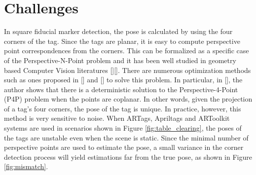 \section{Challenges}
\label{sec:problem}
In square fiducial marker detection, the pose is calculated by using the four corners of the tag. Since the tags are planar, it is easy to compute perspective point correspondences from the corners. This can be formalized as a specific case of the Perspective-N-Point problem and it has been well studied in geometry based Computer Vision literatures [][]. There are numerous optimization methods such as ones proposed in [] and [] to solve this problem. In particular, in [], the author shows that there is a deterministic solution to the Perspective-4-Point (P4P) problem when the points are coplanar. In other words, given the projection of a tag's four corners, the pose of the tag is unique. In practice, however, this method is very sensitive to noise. When ARTags, Apriltags and ARToolkit systems are used in scenarios shown in Figure \ref{fig:table_clearing}, the poses of the tags are unstable even when the scene is static. Since the minimal number of perspective points are used to estimate the pose, a small variance in the corner detection process will yield estimations far from the true pose, as shown in Figure \ref{fig:mismatch}.

